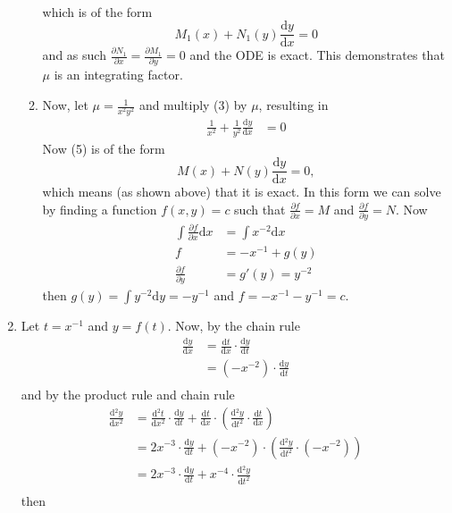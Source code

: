 \documentclass[10pt]{article}
\newcommand*{\dydx}[0]{\frac{\text{d}y}{\text{d}x}}
\newcommand*{\dy}[0]{\text{d}y}
\newcommand*{\dx}[0]{\text{d}x}
\newcommand*{\D}[2]{\frac{\partial{#1}}{\partial{#2}}}%
\newcommand*{\df}[2]{\frac{\text{d}{#1}}{\text{d}{#2}}}%
\begin{document}
\begin{enumerate}
\begin{enumerate}
\begin{align*}
                    \end{align*}
                    which is of the form $$M_1(x) + N_1(y)\dydx = 0$$ and as such 
                    $\D{N_1}{x} = \D{M_1}{y} = 0$ and the ODE is exact. This
                    demonstrates that $\mu$ is an integrating factor.
                \item Now, let $\mu = \frac{1}{x^2y^2}$ and multiply (3) by
                    $\mu$, resulting in
                    \begin{align}
                        \frac{1}{x^2} + \frac{1}{y^2} \dydx &= 0
                    \end{align}
                    Now (5) is of the form $$M(x) + N(y)\dydx = 0,$$ which
                    means  (as shown above) that it is exact. In this form we
                    can solve by finding a function $f(x,y) = c$ such that
                    $\D{f}{x} = M$ and $\D{f}{y} = N$. Now
                    \begin{align*}
                        \int \D{f}{x} \dx &= \int x^{-2} \dx \\
                        f &= -x^{-1} + g(y) \\
                        \D{f}{y} &= g'(y) = y^{-2}
                    \end{align*}
                    then $g(y) = \int y^{-2} \dy = -y^{-1}$
                    and $f = -x^{-1} -y^{-1} = c$.
            \end{enumerate}
        \item Let $t = x^{-1}$ and $y = f(t)$. Now, by the chain rule
            \begin{align*}
                \df{y}{x} &= \df{t}{x}\cdot\df{y}{t} \\
                          &= (-x^{-2})\cdot\df{y}{t} \\
            \end{align*}
            and by the product rule and chain rule
            \begin{align*}
                \df{^2y}{x^2} &= \df{^2t}{x^2}\cdot\df{y}{t} + \df{t}{x}\cdot\left(\df{^2y}{t^2}\cdot\df{t}{x}\right) \\
                &= 2x^{-3}\cdot\df{y}{t} + (-x^{-2})\cdot\left(\df{^2y}{t^2}\cdot(-x^{-2})\right) \\
                &= 2x^{-3}\cdot\df{y}{t} + x^{-4}\cdot\df{^2y}{t^2} \\
            \end{align*}
            then
            \begin{align*}

\end{align*}
\end{enumerate}
\end{document}
